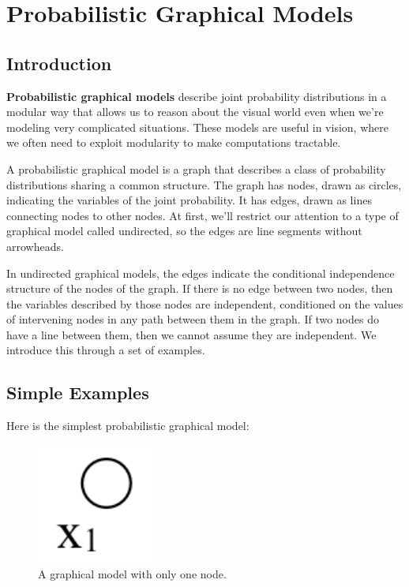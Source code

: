 \chapter{Probabilistic Graphical Models}
\label{chapter:probabilistic_graphical_models}



\section{Introduction}

{\bf Probabilistic graphical models} describe joint probability
distributions in a modular way that allows us to reason about the
visual world even when we're modeling very complicated situations.
These models are useful in vision, where we often need to exploit
modularity to make computations tractable.

A probabilistic graphical model is a graph that describes a class of
probability distributions sharing a common structure.  The graph
has nodes, drawn as circles, indicating the variables of the joint
probability.  It has edges, drawn as lines connecting nodes
to other nodes.  At first, we'll restrict our attention to a type of
graphical model called undirected, so the edges are line segments
without arrowheads.

In undirected graphical models, the edges indicate the conditional independence structure of
the nodes of the graph.  If there is no edge between two nodes, then
the variables described by those nodes are independent, conditioned on the values of intervening nodes in
any path between them in the graph.  If two nodes do have a line between
them, then we cannot assume they are independent.  We
introduce this through a set of examples.  


\section{Simple Examples}
Here is the simplest probabilistic graphical model:
\begin{figure}
\centerline{\includegraphics[width=0.08\linewidth]{figures/graphical_models/x1.pdf}}
\caption{A graphical model with only one node.}
\end{figure}

